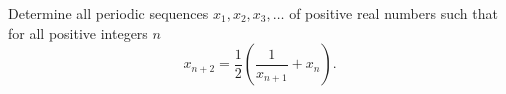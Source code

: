 Determine all periodic sequences $x_1, x_2, x_3, \ldots$ of positive real numbers
such that for all positive integers $n$
$$x_{n+2}=\frac{1}{2}\left(\frac{1}{x_{n+1}}+x_{n}\right).$$
